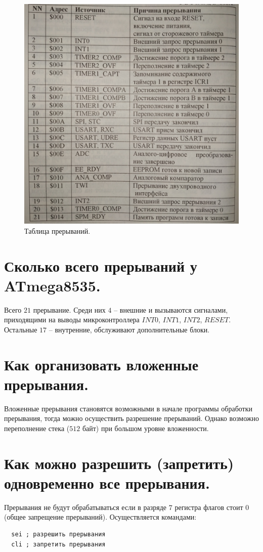 \begin{figure}[h!]
  \includegraphics[width=\linewidth]{pics/27.jpg}
  \caption{Таблица прерываний.}
  \label{img::table}
\end{figure}

\section{Сколько всего прерываний у ATmega8535.}
Всего $21$ прерывание. Среди них $4$ -- внешние 
и вызываются сигналами, приходящими на выводы микроконтроллера
$INT0$, $INT1$, $INT2$, $RESET$. Остальные $17$ -- внутренние, обслуживают
дополнительные блоки.


\section{Как организовать вложенные прерывания.}
Вложенные прерывания становятся возможными в начале программы обработки
прерывания, тогда можно осуществить разрешение прерываний. Однако 
возможно переполнение стека ($512$ байт) при большом уровне вложенности.


\section{Как можно разрешить (запретить) одновременно все прерывания.}
Прерывания не будут обрабатываться если в разряде $7$ регистра флагов 
стоит $0$ (общее запрещение прерываний). Осуществляется командами:
\begin{verbatim}
  sei ; разрешить прерывания
  cli ; запретить прерывания
\end{verbatim}

